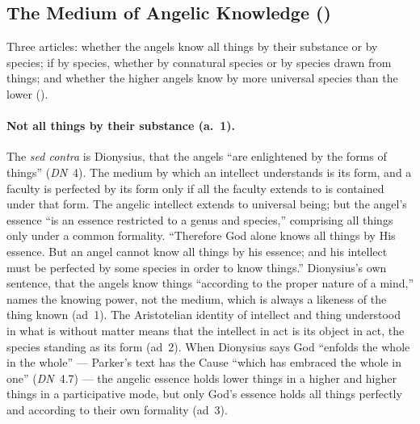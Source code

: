 \subsection{The Medium of Angelic Knowledge ()}\label{sec:q55}

Three articles: whether the angels know all things by their substance or
by species; if by species, whether by connatural species or by species
drawn from things; and whether the higher angels know by more universal
species than the lower ().

\paragraph{Not all things by their substance (a.~1).} The \emph{sed
contra} is Dionysius, that the angels ``are enlightened by the forms of
things'' (\emph{DN}~4). The medium by which an intellect understands is
its form, and a faculty is perfected by its form only if all the faculty
extends to is contained under that form. The angelic intellect extends to
universal being; but the angel's essence ``is an essence restricted to a
genus and species,'' comprising all things only under a common formality.
``Therefore God alone knows all things by His essence. But an angel cannot
know all things by his essence; and his intellect must be perfected by
some species in order to know things.'' Dionysius's own sentence, that the
angels know things ``according to the proper nature of a mind,'' names the
knowing power, not the medium, which is always a likeness of the thing
known (ad~1). The Aristotelian identity of intellect and thing understood
in what is without matter means that the intellect in act is its object in
act, the species standing as its form (ad~2). When Dionysius says God
``enfolds the whole in the whole'' --- Parker's text has the Cause ``which
has embraced the whole in one'' (\emph{DN}~4.7) --- the angelic essence
holds lower things in a higher and higher things in a participative mode,
but only God's essence holds all things perfectly and according to their
own formality (ad~3).

